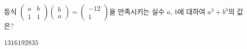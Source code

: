 등식 $\begin{pmatrix} a & b \\ 1 & 1 \end{pmatrix}\begin{pmatrix} b \\ a \end{pmatrix}=\begin{pmatrix} -12 \\ 1 \end{pmatrix}$을 만족시키는 실수 $a$, $b$에 대하여 $a^3+b^3$의 값은?
\begin{choices32}{$13$}{$16$}{$19$}{$28$}{$35$}\end{choices32}
